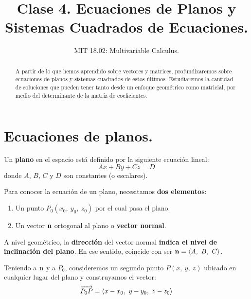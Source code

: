 \documentclass[12pt]{article}
\title{Clase 4. Ecuaciones de Planos y Sistemas Cuadrados de Ecuaciones.}
\author{MIT 18.02: Multivariable Calculus.}
\date{}
\begin{document}


\maketitle

\begin{abstract}
\noindent A partir de lo que hemos aprendido sobre vectores y matrices, profundizaremos sobre ecuaciones de planos y sistemas cuadrados de estos últimos. Estudiaremos la cantidad de soluciones que pueden tener tanto desde un enfoque geométrico como matricial, por medio del determinante de la matriz de coeficientes.
\end{abstract}


\section{Ecuaciones de planos.}

Un \textbf{plano} en el espacio está definido por la siguiente ecuación lineal:
\[
  Ax + By + Cz = D
\]
donde $A$, $B$, $C$ y $D$ son constantes (o escalares).

Para conocer la ecuación de un plano, necesitamos \textbf{dos elementos}:

\begin{enumerate}
\item Un punto $P_{0}(x_{0}, \ y_{0}, \ z_{0})$ por el cual pasa el plano.
\item Un vector $\mathbf{n}$ ortogonal al plano o \textbf{vector normal}.
\end{enumerate}

A nivel geométrico, la \textbf{dirección} del vector normal \textbf{indica el nivel de inclinación del plano}. En ese sentido, coincide con ser $\mathbf{n} = \langle A, \ B, \ C \rangle$.

Teniendo a $\mathbf{n}$ y a $P_{0}$, consideremos un segundo punto $P(x, \ y, \ z)$ ubicado en cualquier lugar del plano y construyamos el vector:
\[
  \overrightarrow{P_{0}P} = \langle x - x_{0}, \ y - y_{0}, \ z - z_{0} \rangle
\]
\end{document}

